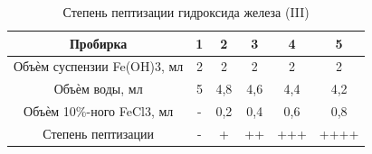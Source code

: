 \documentclass[a4paper, 12pt]{article}
\begin{document}
\begin{table}[h!]
\begin{center}
\caption{Степень пептизации гидроксида железа (III)}
\begin{tabular}{|c|c|c|c|c|c|}
\hline
Пробирка                    & 1 & 2   & 3   & 4   & 5    \\ \hline
Объѐм суспензии Fe(OH)3, мл & 2 & 2   & 2   & 2   & 2    \\ \hline
Объѐм воды, мл              & 5 & 4,8 & 4,6 & 4,4 & 4,2  \\ \hline
Объѐм 10\%-ного FeCl3, мл   & - & 0,2 & 0,4 & 0,6 & 0,8  \\ \hline
Степень пептизации          & - & +   & ++  & +++ & ++++ \\ \hline
\end{tabular}
\end{center}
\end{table}
\end{document}
